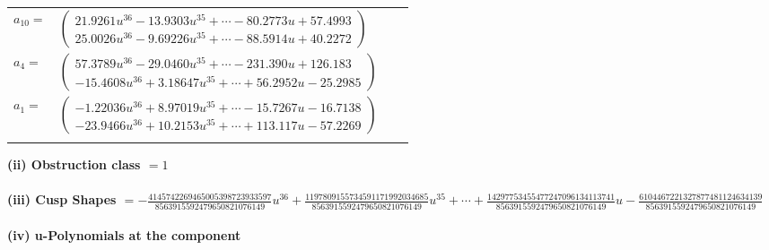 \documentclass[1p]{elsarticle_modified}
\theoremstyle{definition}
\begin{document}
\begin{tabular}{m{7pt} m{180pt} m{7pt} m{180pt} }
\flushright $a_{10}=$&$\begin{pmatrix}21.9261 u^{36}-13.9303 u^{35}+\cdots-80.2773 u+57.4993\\25.0026 u^{36}-9.69226 u^{35}+\cdots-88.5914 u+40.2272\end{pmatrix}$ \\
\flushright $a_{4}=$&$\begin{pmatrix}57.3789 u^{36}-29.0460 u^{35}+\cdots-231.390 u+126.183\\-15.4608 u^{36}+3.18647 u^{35}+\cdots+56.2952 u-25.2985\end{pmatrix}$ \\
\flushright $a_{1}=$&$\begin{pmatrix}-1.22036 u^{36}+8.97019 u^{35}+\cdots-15.7267 u-16.7138\\-23.9466 u^{36}+10.2153 u^{35}+\cdots+113.117 u-57.2269\end{pmatrix}$\\&\end{tabular}
\flushleft \textbf{(ii) Obstruction class $= 1$}\\~\\
\flushleft \textbf{(iii) Cusp Shapes $= -\frac{4145742269465005398723933597}{8563915592479650821076149} u^{36}+\frac{1197809155734591171992034685}{8563915592479650821076149} u^{35}+\cdots+\frac{14297753455477247096134113741}{8563915592479650821076149} u-\frac{6104467221327877481124634139}{8563915592479650821076149}$}\\~\\
\newpage\renewcommand{\arraystretch}{1}
\flushleft \textbf{(iv) u-Polynomials at the component}\newline \\
\end{document}
